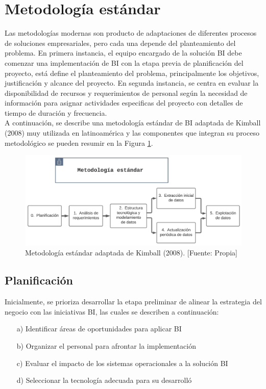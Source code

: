 \documentclass[11pt,titlepage]{report}
\begin{document}
\section{Metodología estándar}
Las metodologías modernas son producto de adaptaciones de diferentes procesos de soluciones empresariales, pero cada una depende del planteamiento del problema. En primera instancia, el equipo encargado de la solución BI debe comenzar una implementación de BI con la etapa previa de planificación del proyecto, está define el planteamiento del problema, principalmente los objetivos, justificación y alcance del  proyecto. En segunda instancia, se centra en evaluar la disponibilidad de recursos y requerimientos de personal según la necesidad de información para asignar actividades especificas del proyecto con detalles de tiempo de duración  y frecuencia.\\ 

A continuación, se describe una metodología estándar de BI adaptada de Kimball (2008) muy utilizada en latinoamérica y las componentes que integran su proceso metodológico se pueden resumir en la Figura \ref{fig: metEstandar}.

\begin{figure}[h]
	\centering
	\includegraphics[width=1.08\linewidth]{Figuras/Met_estandar}
	\caption{Metodología estándar adaptada de Kimball (2008). [Fuente: Propia]}
	\label{fig: metEstandar}
\end{figure}


\subsection{Planificación}
Inicialmente, se prioriza desarrollar la etapa preliminar de alinear la estrategia del negocio con las iniciativas BI, las cuales se describen a continuación:
\begin{itemize}
\item[a)] Identificar áreas de oportunidades para aplicar BI
\item[b)] Organizar el personal para afrontar la implementación
\item[c)] Evaluar el impacto de los sistemas operacionales a la solución BI
\item[d)] Seleccionar la tecnología adecuada para su desarrolló
\end{itemize}
\end{document}
